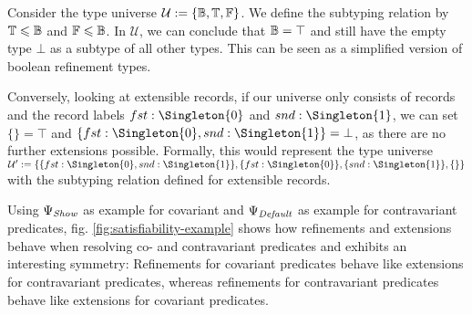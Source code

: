 Consider the type universe $\mathcal{U} := \{ \mathbb{B}, \mathbb{T}, \mathbb{F} \}$.
We define the subtyping relation by $\mathbb{T} \leqslant \mathbb{B}$ and $\mathbb{F} \leqslant \mathbb{B}$.
In $\mathcal{U}$, we can conclude that $\mathbb{B} = \top$ and still have the empty type $\bot$ as a subtype of all other types.
This can be seen as a simplified version of boolean refinement types. \cite{springer}

Conversely, looking at extensible records, if our universe only consists of records and the record labels $fst : \Singleton{0}$ and $snd : \Singleton{1}$, we can set $\{\} = \top$ and $\{ fst : \Singleton{0}, snd : \Singleton{1} \} = \bot$, as there are no further extensions possible.
Formally, this would represent the type universe $\mathcal{U}' := \{ \{ fst : \Singleton{0}, snd : \Singleton{1} \}, \{ fst : \Singleton{0} \}, \{ snd : \Singleton{1} \}, \{\} \}$ with the subtyping relation defined for extensible records.

Using $\Psi_\mathit{Show}$ as example for covariant and $\Psi_\mathit{Default}$ as example for contravariant predicates, fig. \ref{fig:satisfiability-example} shows how refinements and extensions behave when resolving co- and contravariant predicates and exhibits an interesting symmetry:
Refinements for covariant predicates behave like extensions for contravariant predicates, whereas refinements for contravariant predicates behave like extensions for covariant predicates.

